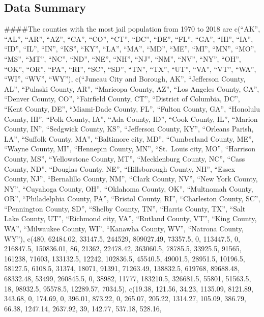 \documentclass[
]{article}
\begin{document}
\hypertarget{data-summary}{%
\subsection{Data Summary}\label{data-summary}}

\#\#\#\#The counties with the most jail population from 1970 to 2018 are
c(``AK'', ``AL'', ``AR'', ``AZ'', ``CA'', ``CO'', ``CT'', ``DC'',
``DE'', ``FL'', ``GA'', ``HI'', ``IA'', ``ID'', ``IL'', ``IN'', ``KS'',
``KY'', ``LA'', ``MA'', ``MD'', ``ME'', ``MI'', ``MN'', ``MO'', ``MS'',
``MT'', ``NC'', ``ND'', ``NE'', ``NH'', ``NJ'', ``NM'', ``NV'', ``NY'',
``OH'', ``OK'', ``OR'', ``PA'', ``RI'', ``SC'', ``SD'', ``TN'', ``TX'',
``UT'', ``VA'', ``VT'', ``WA'', ``WI'', ``WV'', ``WY''), c(``Juneau City
and Borough, AK'', ``Jefferson County, AL'', ``Pulaski County, AR'',
``Maricopa County, AZ'', ``Los Angeles County, CA'', ``Denver County,
CO'', ``Fairfield County, CT'', ``District of Columbia, DC'', ``Kent
County, DE'', ``Miami-Dade County, FL'', ``Fulton County, GA'',
``Honolulu County, HI'', ``Polk County, IA'', ``Ada County, ID'', ``Cook
County, IL'', ``Marion County, IN'', ``Sedgwick County, KS'',
``Jefferson County, KY'', ``Orleans Parish, LA'', ``Suffolk County,
MA'', ``Baltimore city, MD'', ``Cumberland County, ME'', ``Wayne County,
MI'', ``Hennepin County, MN'', ``St.~Louis city, MO'', ``Harrison
County, MS'', ``Yellowstone County, MT'', ``Mecklenburg County, NC'',
``Cass County, ND'', ``Douglas County, NE'', ``Hillsborough County,
NH'', ``Essex County, NJ'', ``Bernalillo County, NM'', ``Clark County,
NV'', ``New York County, NY'', ``Cuyahoga County, OH'', ``Oklahoma
County, OK'', ``Multnomah County, OR'', ``Philadelphia County, PA'',
``Bristol County, RI'', ``Charleston County, SC'', ``Pennington County,
SD'', ``Shelby County, TN'', ``Harris County, TX'', ``Salt Lake County,
UT'', ``Richmond city, VA'', ``Rutland County, VT'', ``King County,
WA'', ``Milwaukee County, WI'', ``Kanawha County, WV'', ``Natrona
County, WY''), c(480, 62484.02, 33147.5, 244529, 809027.49, 73357.5, 0,
113447.5, 0, 216847.5, 150836.01, 86, 21362, 22478.42, 363060.5,
78785.5, 33925.5, 91565, 161238, 71603, 133132.5, 12242, 102836.5,
45540.5, 49001.5, 28951.5, 10196.5, 58127.5, 6108.5, 31374, 18071,
91391, 71263.49, 138832.5, 619768, 89688.48, 68332.48, 53499, 260845.5,
0, 38982, 11777, 183210.5, 326681.5, 55801, 51563.5, 18, 98932.5,
95578.5, 12289.57, 7034.5), c(19.38, 121.56, 34.23, 1135.09, 8121.89,
343.68, 0, 174.69, 0, 396.01, 873.22, 0, 265.07, 205.22, 1314.27,
105.09, 386.79, 66.38, 1247.14, 2637.92, 39, 142.77, 537.18, 528.16,
\end{document}
